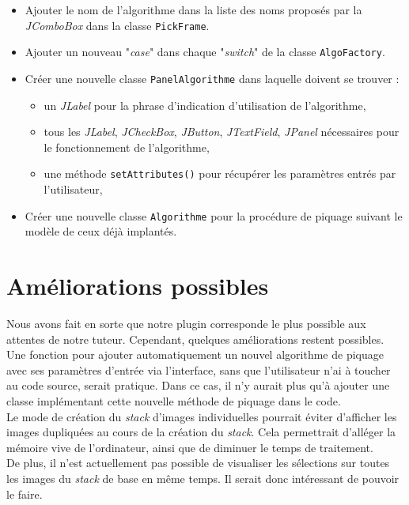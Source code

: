 \begin{itemize}
\item Ajouter le nom de l'algorithme dans la liste des noms proposés par la \emph{JComboBox} dans la classe \texttt{PickFrame}.
\item Ajouter un nouveau "\textit{case}" dans chaque "\textit{switch}" de la classe \texttt{AlgoFactory}.
\item Créer une nouvelle classe \texttt{PanelAlgorithme} dans laquelle doivent se trouver :
	\begin{itemize}
	\item un \emph{JLabel} pour la phrase d'indication d'utilisation de l'algorithme,
	\item tous les \emph{JLabel}, \emph{JCheckBox}, \emph{JButton}, \emph{JTextField}, \emph{JPanel} nécessaires pour le fonctionnement de l'algorithme,
	\item une méthode \texttt{setAttributes()} pour récupérer les paramètres entrés par l'utilisateur,
	\end{itemize}
\item Créer une nouvelle classe \texttt{Algorithme} pour la procédure de piquage suivant le modèle de ceux déjà implantés. 
\end{itemize}

\section{Améliorations possibles}

Nous avons fait en sorte que notre plugin corresponde le plus possible aux attentes de notre tuteur. Cependant, quelques améliorations restent possibles. \\

Une fonction pour ajouter automatiquement un nouvel algorithme de piquage avec ses paramètres d'entrée via l'interface, sans que l'utilisateur n'ai à toucher au code source, serait pratique. Dans ce cas, il n'y aurait plus qu'à ajouter une classe implémentant cette nouvelle méthode de piquage dans le code. \\

Le mode de création du \textit{stack} d'images individuelles pourrait éviter d'afficher les images dupliquées au cours de la création du \textit{stack}. Cela permettrait d'alléger la mémoire vive de l'ordinateur, ainsi que de diminuer le temps de traitement. \\
De plus, il n'est actuellement pas possible de visualiser les sélections sur toutes les images du \textit{stack} de base en même temps. Il serait donc intéressant de pouvoir le faire. \\

